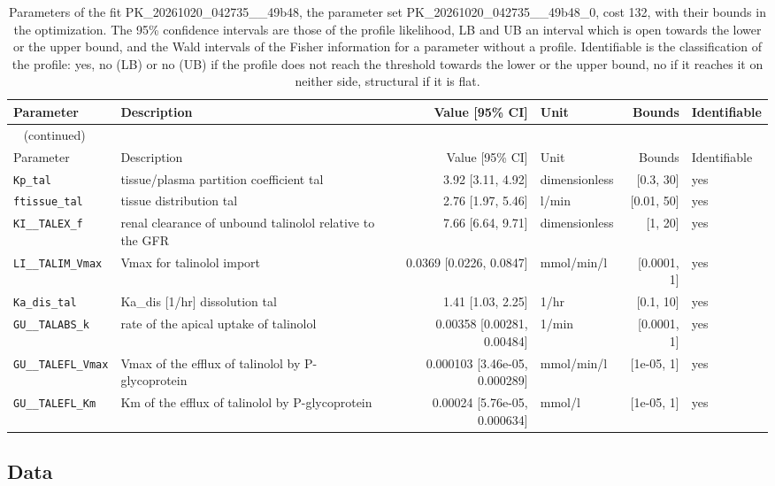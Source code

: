 \begin{longtable}{llrlrl}
\caption{Parameters of the fit PK\_20261020\_042735\_\_49b48, the parameter set PK\_20261020\_042735\_\_49b48\_0, cost 132, with their bounds in the optimization. The 95\% confidence intervals are those of the profile likelihood, LB and UB an interval which is open towards the lower or the upper bound, and the Wald intervals of the Fisher information for a parameter without a profile. Identifiable is the classification of the profile: yes, no (LB) or no (UB) if the profile does not reach the threshold towards the lower or the upper bound, no if it reaches it on neither side, structural if it is flat.}\label{tab:parameters:PK_20261020_042735__49b48} \\
\toprule
Parameter & Description & Value [95\% CI] & Unit & Bounds & Identifiable \\
\midrule
\endfirsthead
\multicolumn{6}{l}{\small\tablename~\thetable{} (continued)} \\
\toprule
Parameter & Description & Value [95\% CI] & Unit & Bounds & Identifiable \\
\midrule
\endhead
\bottomrule
\endlastfoot
\texttt{Kp\_tal} & tissue/plasma partition coefficient tal & 3.92 [3.11, 4.92] & dimensionless & [0.3, 30] & yes \\
\texttt{ftissue\_tal} & tissue distribution tal & 2.76 [1.97, 5.46] & l/min & [0.01, 50] & yes \\
\texttt{KI\_\_TALEX\_f} & renal clearance of unbound talinolol relative to the GFR & 7.66 [6.64, 9.71] & dimensionless & [1, 20] & yes \\
\texttt{LI\_\_TALIM\_Vmax} & Vmax for talinolol import & 0.0369 [0.0226, 0.0847] & mmol/min/l & [0.0001, 1] & yes \\
\texttt{Ka\_dis\_tal} & Ka\_dis [1/hr] dissolution tal & 1.41 [1.03, 2.25] & 1/hr & [0.1, 10] & yes \\
\texttt{GU\_\_TALABS\_k} & rate of the apical uptake of talinolol & 0.00358 [0.00281, 0.00484] & 1/min & [0.0001, 1] & yes \\
\texttt{GU\_\_TALEFL\_Vmax} & Vmax of the efflux of talinolol by P-glycoprotein & 0.000103 [3.46e-05, 0.000289] & mmol/min/l & [1e-05, 1] & yes \\
\texttt{GU\_\_TALEFL\_Km} & Km of the efflux of talinolol by P-glycoprotein & 0.00024 [5.76e-05, 0.000634] & mmol/l & [1e-05, 1] & yes \\
\end{longtable}

\subsection{Data}

